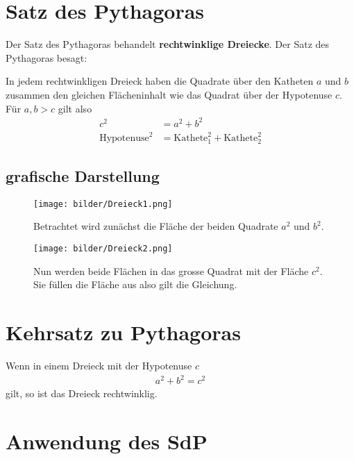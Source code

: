 \documentclass{report}
\theoremstyle{definition}
\theoremstyle{definition}
\theoremstyle{an}
\theoremstyle{lem}
\theoremstyle{def}
\theoremstyle{def}
\begin{document}
	\section{Satz des Pythagoras}
	Der Satz des Pythagoras behandelt \textbf{rechtwinklige Dreiecke}. Der Satz des Pythagoras besagt:
	\begin{defi}
		In jedem rechtwinkligen Dreieck haben die Quadrate über den Katheten $a$ und $b$ zusammen den gleichen Flächeninhalt wie das Quadrat über der Hypotenuse $c$. Für $a,b>c$ gilt also 
		\begin{align}
			c^2&=a^2+b^2 \label{eq:eq16}\\
			\text{Hypotenuse}^2&=\text{Kathete}_1^2+\text{Kathete}_2^2
		\end{align}
	\end{defi}
	\subsection{grafische Darstellung}
	\begin{figure}[h]
		\begin{minipage}{0.5\linewidth}
			
			\texttt{[image: bilder/Dreieck1.png]}
			
			\caption[Grafische Darstellung des SdP I]{Betrachtet wird zunächst die Fläche der beiden Quadrate $a^2$ und $b^2$.}
			\label{fig:fig12}
		\end{minipage}
		\begin{minipage}{0.5\linewidth}
			
			\texttt{[image: bilder/Dreieck2.png]}
			
			\caption[Grafische Darstellung des SdP I]{Nun werden beide Flächen in das grosse Quadrat mit der Fläche $c^2$. Sie füllen die Fläche aus also gilt die Gleichung. }
			\label{fig:fig13}
		\end{minipage}
	\end{figure} \pagebreak
	\section{Kehrsatz zu Pythagoras}
	\begin{defi}
		Wenn in einem Dreieck mit der Hypotenuse $c$ \begin{align}
			a^2+b^2=c^2
		\end{align} gilt, so ist das Dreieck rechtwinklig.
	\end{defi}
	\section{Anwendung des SdP}
	
\end{document}
